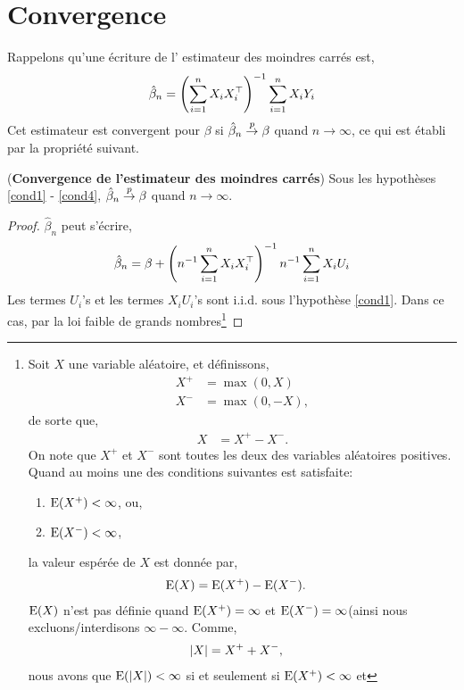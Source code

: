 \section{Convergence}
Rappelons qu'une écriture de l' estimateur des moindres carrés est,
\begin{align*}
\hat{\beta}_n= \left(\sum_{i=1}^n X_iX_i^\top\right)^{-1}\sum_{i=1}^n X_iY_i
\end{align*}
Cet estimateur est convergent pour $\beta$ si $\hat{\beta}_n\overset{p}{\rightarrow} \beta$ quand $n\to \infty$, ce qui est établi par la propriété suivant.
\begin{propriete}(\textbf{Convergence de l'estimateur des moindres carrés})
Sous les hypothèses \ref{cond1} - \ref{cond4}, $\hat{\beta}_n\overset{p}{\rightarrow} \beta$ quand $n\to \infty$.
\end{propriete}
\begin{proof}
$\hat{\beta}_n$ peut s'écrire,
\begin{align}
\hat{\beta}_n= \beta +  \left(n^{-1}\sum_{i=1}^n X_iX_i^\top\right)^{-1}n^{-1}\sum_{i=1}^n X_iU_i
\label{eq1}
\end{align}
Les termes $U_i$'s et les termes $X_iU_i$'s sont i.i.d. sous l'hypothèse \ref{cond1}. 
Dans ce cas, par la loi faible de grands nombres\footnote{
Soit $X$ une variable aléatoire, et définissons, 
\begin{align*}
    X^{+} &=\max(0, X)\\ 
    X^{-} &=\max(0, -X),
\end{align*}
de sorte que, 
\begin{align*} 
    X &= X^{+} - X^{-}.
\end{align*}
On note que $X^{+}$ et $X^{-}$ sont toutes les deux des variables aléatoires positives. 
Quand au moins une des conditions suivantes est satisfaite: 
\begin{enumerate}[label = (\roman*)]
    \item $\operatorname{E}(X^{+}) < \infty$, ou,
    \item $\operatorname{E}(X^{-}) < \infty$,
\end{enumerate}
la valeur espérée de $X$ est donnée par, 
\begin{align*} 
    \operatorname{E}(X) &= \operatorname{E}(X^{+}) - \operatorname{E}(X^{-}).
\end{align*}
$\operatorname{E}(X)$ n'est pas définie quand  $\operatorname{E}(X^{+}) = \infty$ et $\operatorname{E}(X^{-})=\infty$(ainsi nous excluons/interdisons 
$\infty - \infty$. Comme, 
\begin{align*} 
    \left\vert {X} \right\vert &= X^{+}+ X^{-},
\end{align*}
nous avons que $\operatorname{E}(\left\vert {X} \right\vert)< \infty$ si et seulement si $\operatorname{E}(X^{+}) <\infty$ et
}
\end{proof}

